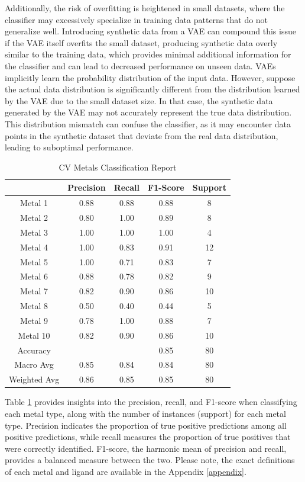 Additionally, the risk of overfitting is heightened in small datasets, where the classifier may excessively specialize in training data patterns that do not generalize well. Introducing synthetic data from a VAE can compound this issue if the VAE itself overfits the small dataset, producing synthetic data overly similar to the training data, which provides minimal additional information for the classifier and can lead to decreased performance on unseen data. VAEs implicitly learn the probability distribution of the input data. However, suppose the actual data distribution is significantly different from the distribution learned by the VAE due to the small dataset size. In that case, the synthetic data generated by the VAE may not accurately represent the true data distribution. This distribution mismatch can confuse the classifier, as it may encounter data points in the synthetic dataset that deviate from the real data distribution, leading to suboptimal performance.
\begin{table}[!h]
\begin{center}
\begin{tabular}{c|c|c|c|c}
 & Precision & Recall & F1-Score & Support\\
\hline
Metal 1 & 0.88 & 0.88 & 0.88 & 8\\
Metal 2 & 0.80 & 1.00 & 0.89 & 8\\
Metal 3 & 1.00 & 1.00 & 1.00 & 4\\
Metal 4 & 1.00 & 0.83 & 0.91 & 12\\
Metal 5 & 1.00 & 0.71 & 0.83 & 7\\
Metal 6 & 0.88 & 0.78 & 0.82 & 9\\
Metal 7 & 0.82 & 0.90 & 0.86 & 10\\
Metal 8 & 0.50 & 0.40 & 0.44 & 5\\
Metal 9 & 0.78 & 1.00 & 0.88 & 7\\
Metal 10 & 0.82 & 0.90 & 0.86 & 10\\
\hline
Accuracy & & & 0.85 & 80\\
Macro Avg & 0.85 & 0.84 & 0.84 & 80\\
Weighted Avg & 0.86 & 0.85 & 0.85 & 80
\end{tabular}
\caption{CV Metals Classification Report}
\label{cv_metal_report}
\end{center}
\end{table}
Table \ref{cv_metal_report} provides insights into the precision, recall, and F1-score when classifying each metal type, along with the number of instances (support) for each metal type. Precision indicates the proportion of true positive predictions among all positive predictions, while recall measures the proportion of true positives that were correctly identified. F1-score, the harmonic mean of precision and recall, provides a balanced measure between the two. Please note, the exact definitions of each metal and ligand are available in the Appendix \ref{appendix}.
